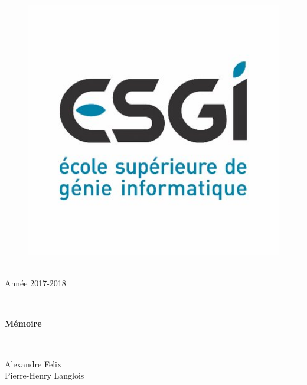 \documentclass[12pt]{report}
\begin{document}
    \begin{titlepage}
    \begin{center}
    
    \begin{figure}
        \centering
        \begin{minipage}{0.33\textwidth}
            \includegraphics[width=1\textwidth]{Images/esgi} %
        \end{minipage}
    \end{figure}
    ~\\[3\baselineskip]
    {\large Année 2017-2018}\\[0.7cm]
    
    \rule{\linewidth}{0.5mm} \\[0.4cm]
    { \huge \bfseries Mémoire\\[0.4cm] }
    \rule{\linewidth}{0.5mm} \\[1.5cm]
    
    {\large Alexandre Felix }\\[0.3cm]
    {\large Pierre-Henry Langlois }\\[0.3cm]
    \vfill
    \end{center}
    \end{titlepage}
    \clearpage
    
    \newpage
    \renewcommand{\baselinestretch}{1.30}\small \normalsize
    \tableofcontents
    \renewcommand{\baselinestretch}{1.18}\small \normalsize
    
    
    
    
    \printglossaries
    \listoffigures
    
    
\end{document}
